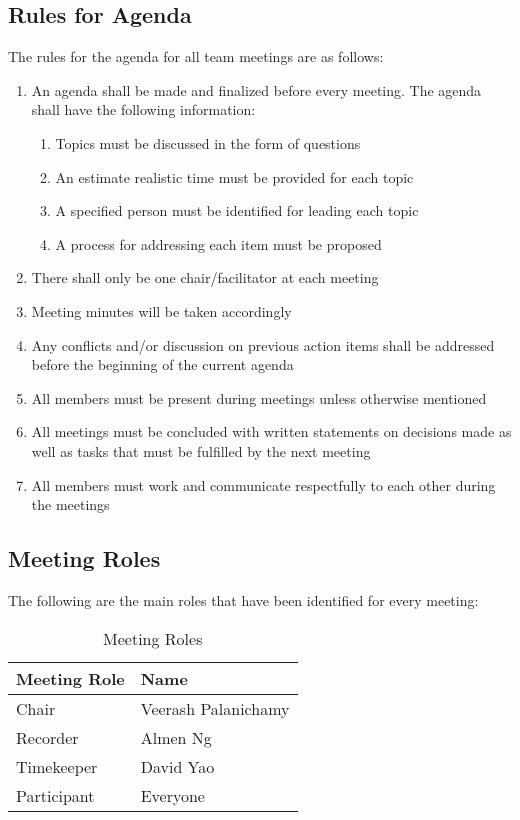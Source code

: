 \documentclass[12pt,letterpaper]{article}
\begin{document}
\subsection{Rules for Agenda}
The rules for the agenda for all team meetings are as follows:
\begin{enumerate}
    \item An agenda shall be made and finalized before every meeting. The agenda shall have the following information: 
    \begin{enumerate}
        \item Topics must be discussed in the form of questions 
        \item An estimate realistic time must be provided for each topic 
        \item A specified person must be identified for leading each topic 
        \item A process for addressing each item must be proposed
    \end{enumerate}
    \item There shall only be one chair/facilitator at each meeting
    \item Meeting minutes will be taken accordingly 
    \item Any conflicts and/or discussion on previous action items shall be addressed before the beginning of the current agenda
    \item All members must be present during meetings unless otherwise mentioned
    \item All meetings must be concluded with written statements on decisions made as well as tasks that must be fulfilled by the next meeting
    \item All members must work and communicate respectfully to each other during the meetings
\end{enumerate}

\newpage

\subsection{Meeting Roles}
The following are the main roles that have been identified for every meeting:

\begin{table}[hbt!]
    \centering
    \begin{tabularx}{\textwidth}{|X|X|}
        \toprule
        \textbf{Meeting Role} & \textbf{Name}\\
        \midrule
        Chair       & Veerash Palanichamy\\
        Recorder    & Almen Ng\\
        Timekeeper  & David Yao\\
        Participant & Everyone\\
        \bottomrule
    \end{tabularx}
\caption{Meeting Roles} \label{tab:meetingRoles}
\end{table}
\end{document}
